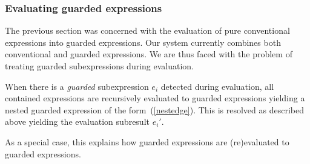 \subsubsection{Evaluating guarded expressions}
The previous section was concerned with the evaluation of pure
conventional expressions into guarded expressions. Our system
currently combines both conventional and guarded expressions. We are
thus faced with the problem of treating guarded subexpressions during
evaluation.

When there is a {\em guarded} subexpression $e_i$ detected during
evaluation, all contained expressions are recursively evaluated to
guarded expressions yielding a nested guarded expression of the
form~(\ref{nestedge}). This is resolved as described above yielding
the evaluation subresult $e_i'$.

As a special case, this explains how guarded expressions are
(re)evaluated to guarded expressions.
%
